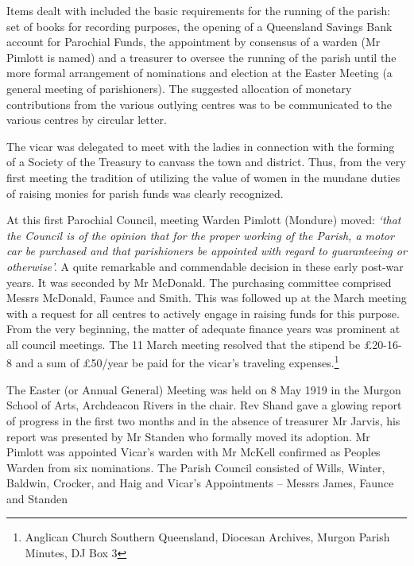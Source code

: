 Items dealt with included the basic requirements for the running of the parish: set of books for recording purposes, the opening of a Queensland Savings Bank account for Parochial Funds, the appointment by consensus of a warden (Mr Pimlott is named) and a treasurer to oversee the running of the parish until the more formal arrangement of nominations and election at the Easter Meeting (a general meeting of parishioners). The suggested allocation of monetary contributions from the various outlying centres was to be communicated to the various centres by circular letter.



The vicar was delegated to meet with the ladies in connection with the forming of a Society of the Treasury to canvass the town and district. Thus, from the very first meeting the tradition of utilizing the value of women in the mundane duties of raising monies for parish funds was clearly recognized.



At this first Parochial Council, meeting Warden Pimlott (Mondure) moved: \emph{`that the Council is of the opinion that for the proper working of the Parish, a motor car be purchased and that parishioners be appointed with regard to guaranteeing or otherwise'.} A quite remarkable and commendable decision in these early post-war years. It was seconded by Mr McDonald. The purchasing committee comprised Messrs McDonald, Faunce and Smith. This was followed up at the March meeting with a request for all centres to actively engage in raising funds for this purpose. From the very beginning, the matter of adequate finance years was prominent at all council meetings. The 11 March meeting resolved that the stipend be \pounds20-16-8 and a sum of \pounds50/year be paid for the vicar's traveling expenses.\footnote{Anglican Church Southern Queensland, Diocesan Archives, Murgon Parish Minutes, DJ Box 3}


The Easter (or Annual General) Meeting was held on 8 May 1919 in the Murgon School of Arts, Archdeacon Rivers in the chair. Rev Shand gave a glowing report of progress in the first two months and in the absence of treasurer Mr Jarvis, his report was presented by Mr Standen who formally moved its adoption. Mr Pimlott was appointed Vicar's warden with Mr McKell confirmed as Peoples Warden from six nominations. The Parish Council consisted of Wills, Winter, Baldwin, Crocker, and Haig and Vicar's Appointments -- Messrs James, Faunce and Standen



